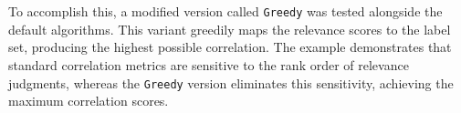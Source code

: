 \\\\
To accomplish this, a modified version called \texttt{Greedy} was tested alongside the default algorithms. This variant greedily maps the relevance scores to the label set, producing the highest possible correlation. The example demonstrates that standard correlation metrics are sensitive to the rank order of relevance judgments, whereas the \texttt{Greedy} version eliminates this sensitivity, achieving the maximum correlation scores.

